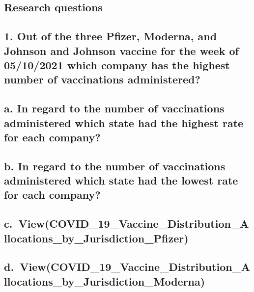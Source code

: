 \documentclass[
]{article}
\begin{document}
\hypertarget{research-questions}{%
\subsection{Research questions}\label{research-questions}}

\hypertarget{out-of-the-three-pfizer-moderna-and-johnson-and-johnson-vaccine-for-the-week-of-05102021-which-company-has-the-highest-number-of-vaccinations-administered}{%
\subsection{1. Out of the three Pfizer, Moderna, and Johnson and Johnson
vaccine for the week of 05/10/2021 which company has the highest number
of vaccinations
administered?}\label{out-of-the-three-pfizer-moderna-and-johnson-and-johnson-vaccine-for-the-week-of-05102021-which-company-has-the-highest-number-of-vaccinations-administered}}

\hypertarget{a.-in-regard-to-the-number-of-vaccinations-administered-which-state-had-the-highest-rate-for-each-company}{%
\subsection{a. In regard to the number of vaccinations administered
which state had the highest rate for each
company?}\label{a.-in-regard-to-the-number-of-vaccinations-administered-which-state-had-the-highest-rate-for-each-company}}

\hypertarget{b.-in-regard-to-the-number-of-vaccinations-administered-which-state-had-the-lowest-rate-for-each-company}{%
\subsection{b. In regard to the number of vaccinations administered
which state had the lowest rate for each
company?}\label{b.-in-regard-to-the-number-of-vaccinations-administered-which-state-had-the-lowest-rate-for-each-company}}

\hypertarget{c.-viewcovid_19_vaccine_distribution_allocations_by_jurisdiction_pfizer}{%
\subsection{c.~View(COVID\_19\_Vaccine\_Distribution\_Allocations\_by\_Jurisdiction\_Pfizer)}\label{c.-viewcovid_19_vaccine_distribution_allocations_by_jurisdiction_pfizer}}

\hypertarget{d.-viewcovid_19_vaccine_distribution_allocations_by_jurisdiction_moderna}{%
\subsection{d.~View(COVID\_19\_Vaccine\_Distribution\_Allocations\_by\_Jurisdiction\_Moderna)}\label{d.-viewcovid_19_vaccine_distribution_allocations_by_jurisdiction_moderna}}
\end{document}
